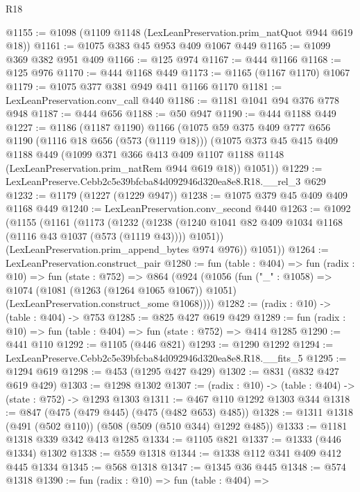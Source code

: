 \begin{lexlean}{R18}
\begin{coremodule}
@1155 := @1098 (@1109 @1148 (LexLeanPreservation.prim_natQuot @944 @619 @18))
@1161 := @1075 @383 @45 @953 @409 @1067 @449
@1165 := @1099 @369 @382 @951 @409
@1166 := @125 @974
@1167 := @444 @1166
@1168 := @125 @976
@1170 := @444 @1168 @449
@1173 := @1165 (@1167 @1170) @1067
@1179 := @1075 @377 @381 @949 @411 @1166 @1170
@1181 := LexLeanPreservation.conv_call @440
@1186 := @1181 @1041 @94 @376 @778 @948
@1187 := @444 @656
@1188 := @50 @947
@1190 := @444 @1188 @449
@1227 := @1186
    (@1187 @1190)
    @1166
    (@1075
      @59
      @375
      @409
      @777
      @656
      @1190
      (@1116 @18 @656 (@573 (@1119 @18)))
      (@1075
        @373
        @45
        @415
        @409
        @1188
        @449
        (@1099
          @371
          @366
          @413
          @409
          @1107
          @1188
          @1148
          (LexLeanPreservation.prim_natRem @944 @619 @18))
        @1051))
@1229 := LexLeanPreserve.Cebb2c5e39bfcba84d092946d320ea8e8.R18.__rel_3 @629
@1232 := @1179 (@1227 (@1229 @947))
@1238 := @1075 @379 @45 @409 @409 @1168 @449
@1240 := LexLeanPreservation.conv_second @440
@1263 := @1092
    (@1155
      (@1161
        (@1173
          (@1232
            (@1238 (@1240 @1041 @82 @409 @1034 @1168 (@1116 @43 @1037 (@573 (@1119 @43)))) @1051))
          (LexLeanPreservation.prim_append_bytes @974 @976))
        @1051))
@1264 := LexLeanPreservation.construct_pair
@1280 := fun (table : @404) =>
  fun (radix : @10) =>
  fun (state : @752) =>
  @864
    (@924
      (@1056
        (fun ("_" : @1058) =>
        @1074
          (@1081 (@1263 (@1264 @1065 @1067)) @1051)
          (LexLeanPreservation.construct_some @1068))))
@1282 := (radix : @10) -> (table : @404) -> @753
@1285 := @825 @427 @619 @429
@1289 := fun (radix : @10) => fun (table : @404) => fun (state : @752) => @414 @1285
@1290 := @441 @110
@1292 := @1105 (@446 @821)
@1293 := @1290 @1292
@1294 := LexLeanPreserve.Cebb2c5e39bfcba84d092946d320ea8e8.R18.__fits_5
@1295 := @1294 @619
@1298 := @453 (@1295 @427 @429)
@1302 := @831 (@832 @427 @619 @429)
@1303 := @1298 @1302
@1307 := (radix : @10) -> (table : @404) -> (state : @752) -> @1293 @1303
@1311 := @467 @110 @1292 @1303 @344
@1318 := @847 (@475 (@479 @445) (@475 (@482 @653) @485))
@1328 := @1311 @1318 (@491 (@502 @110)) (@508 (@509 (@510 @344) @1292 @485))
@1333 := @1181 @1318 @339 @342 @413 @1285
@1334 := @1105 @821
@1337 := @1333 (@446 @1334) @1302
@1338 := @559 @1318
@1344 := @1338 @112 @341 @409 @412 @445 @1334
@1345 := @568 @1318
@1347 := @1345 @36 @445
@1348 := @574 @1318
@1390 := fun (radix : @10) =>
  fun (table : @404) =>

\end{coremodule}
\end{lexlean}
